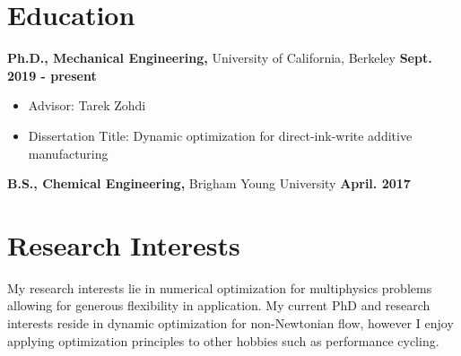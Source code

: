 \documentclass[margin,line]{res}
\begin{document}
\newcommand{\myname}{Brian Howell}
\newlength{\mynamewidth}
\settowidth{\mynamewidth}{\namefont\myname}
\name{\hspace*{0.5\textwidth}\hspace{-0.5\mynamewidth} \myname \vspace*{.1in}}
\thispagestyle{empty}

\begin{resume}



\section{\sc Education}
{\bf Ph.D., Mechanical Engineering,} University of California, Berkeley \hfill {\bf Sept. 2019 - present}\\
\vspace*{-.1in}
\begin{itemize}
	\item[ ] Advisor: Tarek Zohdi
	\item[ ] Dissertation Title: Dynamic optimization for direct-ink-write additive manufacturing
\end{itemize}


{\bf B.S., Chemical Engineering,} Brigham Young University \hfill {\bf April. 2017}\\
\vspace*{-.1in}

\section{\sc Research Interests}
My research interests lie in numerical optimization for multiphysics problems allowing for generous flexibility in application. My current PhD and research interests reside in dynamic optimization for non-Newtonian flow, however I enjoy applying optimization principles to other hobbies such as performance cycling.


\end{resume}
\end{document}
